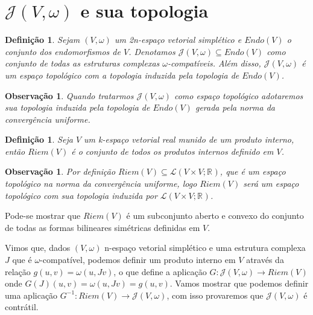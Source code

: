 \documentclass[12pt]{book}
\newtheorem{definicao}[teorema]{Definição}
\newtheorem{observacao}[teorema]{Observação}
\newcommand{\estruturascomplexaspadrao}{\mathcal{J}(V, \omega)}
\newcommand{\produtosinternos}[1]{Riem(#1)}
\newcommand{\real}[1]{\mathbb{R}^{#1}}
\newcommand{\vermelho}[1]{{\color{red}#1}}
\begin{document}
	\section{$\estruturascomplexaspadrao$ e sua topologia}
	
	\begin{definicao} \label{definicao_conjunto_estrutura_complexa}
		Sejam $(V,\omega)$ um 2n-espaço vetorial simplético e $Endo(V)$ o conjunto dos endomorfismos de $V$. Denotamos $\estruturascomplexaspadrao \subseteq Endo(V)$ como conjunto de todas as estruturas complexas $\omega$-compatíveis. Além disso, $\estruturascomplexaspadrao$ é um espaço topológico com a topologia induzida pela topologia de $Endo(V)$.
	\end{definicao}
	
	\begin{observacao}\label{observacao_conjunto_estrutura_complexa}
		Quando tratarmos $\estruturascomplexaspadrao$ como espaço topológico adotaremos sua topologia induzida pela topologia de $Endo(V)$ gerada pela norma da convergência uniforme.
	\end{observacao}

	\begin{definicao}
		Seja $V$ um k-espaço vetorial real munido de um produto interno, então $\produtosinternos{V}$ é o conjunto de todos os produtos internos definido em $V$.
	\end{definicao}
	
	\begin{observacao}
		Por definição $\produtosinternos{V} \subseteq \mathcal{L}(V \times V; \real{})$, que é um espaço topológico na norma da convergência uniforme, logo $\produtosinternos{V}$ será um espaço topológico com sua topologia induzida por $\mathcal{L}(V \times V; \real{})$.
	\end{observacao} 
	
	\vermelho{Pode-se mostrar que $\produtosinternos{V}$ é um subconjunto aberto e convexo do conjunto de todas as formas bilineares simétricas definidas em $V$}.
	
	Vimos que, dados $(V, \omega)$ n-espaço vetorial simplético e uma estrutura complexa $J$ que é $\omega$-compatível, podemos definir um produto interno em $V$ através da relação $g(u,v) = \omega(u,Jv)$, o que define a aplicação $G:\estruturascomplexaspadrao \to \produtosinternos{V}$ onde $G(J)(u,v) = \omega(u,Jv) = g(u,v)$. Vamos mostrar que podemos definir uma aplicação $G^{-1}: \produtosinternos{V} \to \estruturascomplexaspadrao$, com isso provaremos que $\estruturascomplexaspadrao$ é contrátil.
	
\end{document}

